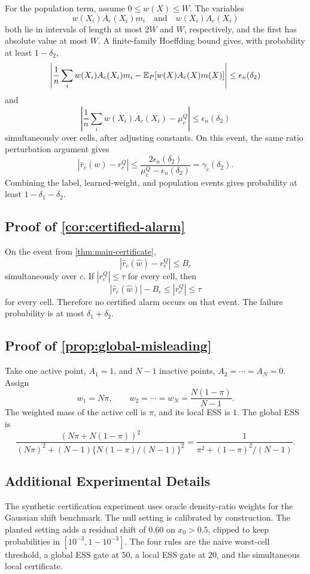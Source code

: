 For the population term, assume \(0\le w(X)\le W\). The variables
\[
w(X_i)A_c(X_i)m_i
\quad\text{and}\quad
w(X_i)A_c(X_i)
\]
both lie in intervals of length at most \(2W\) and \(W\), respectively, and the first has absolute value at most \(W\). A finite-family Hoeffding bound gives, with probability at least \(1-\delta_2\),
\[
\left|
\frac1n\sum_iw(X_i)A_c(X_i)m_i
-
\mathbb{E}_P[w(X)A_c(X)m(X)]
\right|
\le \epsilon_n(\delta_2)
\]
and
\[
\left|
\frac1n\sum_iw(X_i)A_c(X_i)-\mu_c^Q
\right|
\le \epsilon_n(\delta_2)
\]
simultaneously over cells, after adjusting constants. On this event, the same ratio perturbation argument gives
\[
|\bar r_c(w)-r_c^Q|
\le
\frac{2\epsilon_n(\delta_2)}{\mu_c^Q-\epsilon_n(\delta_2)}
=
\gamma_c(\delta_2).
\]
Combining the label, learned-weight, and population events gives probability at least \(1-\delta_1-\delta_2\).

\subsection{Proof of \cref{cor:certified-alarm}}

On the event from \cref{thm:main-certificate},
\[
|\widehat r_c(\widehat w)-r_c^Q|\le B_c
\]
simultaneously over \(c\). If \(|r_c^Q|\le\tau\) for every cell, then
\[
|\widehat r_c(\widehat w)|-B_c\le |r_c^Q|\le\tau
\]
for every cell. Therefore no certified alarm occurs on that event. The failure probability is at most \(\delta_1+\delta_2\).

\subsection{Proof of \cref{prop:global-misleading}}

Take one active point, \(A_1=1\), and \(N-1\) inactive points, \(A_2=\cdots=A_N=0\). Assign
\[
w_1=N\pi,
\qquad
w_2=\cdots=w_N=\frac{N(1-\pi)}{N-1}.
\]
The weighted mass of the active cell is \(\pi\), and its local ESS is \(1\). The global ESS is
\[
\frac{(N\pi+N(1-\pi))^2}
{(N\pi)^2+(N-1)\{N(1-\pi)/(N-1)\}^2}
=
\frac{1}{\pi^2+(1-\pi)^2/(N-1)}.
\]

\subsection{Additional Experimental Details}

The synthetic certification experiment uses oracle density-ratio weights for the Gaussian shift benchmark. The null setting is calibrated by construction. The planted setting adds a residual shift of \(0.60\) on \(x_0>0.5\), clipped to keep probabilities in \([10^{-3},1-10^{-3}]\). The four rules are the naive worst-cell threshold, a global ESS gate at \(50\), a local ESS gate at \(20\), and the simultaneous local certificate.

